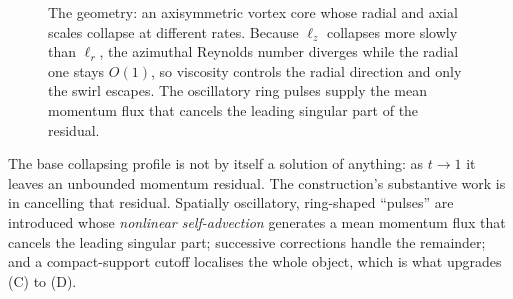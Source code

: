 \begin{figure}[ht]
\centering
{}
\caption[The anisotropic collapsing core]{The geometry: an axisymmetric vortex
core whose radial and axial scales collapse at different rates. Because
\(\ell_z\) collapses more slowly than \(\ell_r\), the azimuthal Reynolds number
diverges while the radial one stays \(O(1)\), so viscosity controls the radial
direction and only the swirl escapes. The oscillatory ring pulses supply the
mean momentum flux that cancels the leading singular part of the residual.}
\label{fig:aniso-geometry}
\end{figure}

The base collapsing profile is not by itself a solution of anything: as
\(t\to1\) it leaves an unbounded momentum residual. The construction's
substantive work is in cancelling that residual. Spatially oscillatory,
ring-shaped ``pulses'' are introduced whose \emph{nonlinear self-advection}
generates a mean momentum flux that cancels the leading singular part;
successive corrections handle the remainder; and a compact-support cutoff
localises the whole object, which is what upgrades (C) to (D).

